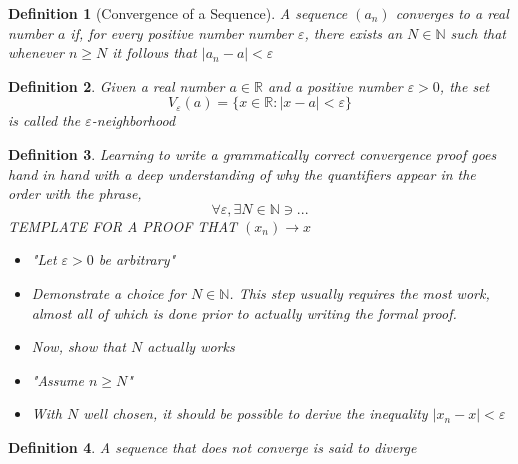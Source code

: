 \documentclass[10pt]{report}
\newtheorem{def2}{Definition}[section]
\newcommand{\eps}{\varepsilon}
\begin{document}
\begin{def2}[Convergence of a Sequence]
A sequence $(a_n)$ converges to a real number $a$ if, for every positive number number $\eps$, there exists an $N\in\mathbb{N}$ such that whenever $n\geq N$ it follows that $|a_n-a|<\eps$
\end{def2}
\begin{def2}
Given a real number $a\in \mathbb{R}$ and a positive number $\eps >0$, the set
$$V_\eps(a) = \{x\in\mathbb{R}:|x-a|<\eps\}$$
is called the $\eps$-neighborhood
\end{def2}
\begin{def2}
Learning to write a grammatically correct convergence proof goes hand in hand with a deep understanding of why the quantifiers appear in the order with the phrase,
$$\forall \eps, \exists N\in\mathbb{N}\ni...$$
TEMPLATE FOR A PROOF THAT $(x_n)\to x$
\begin{itemize}
\item[-] "Let $\eps>0$ be arbitrary"
\item[-] Demonstrate a choice for $N\in \mathbb{N}$. This step usually requires the most work, almost all of which is done prior to actually writing the formal proof.
\item[-] Now, show that $N$ actually works
\item[-] "Assume $n\geq N$"
\item[-] With $N$ well chosen, it should be possible to derive the inequality $|x_n-x|<\eps$
\end{itemize}
\end{def2}
\begin{def2}
A sequence that does not converge is said to diverge
\end{def2}
\end{document}
